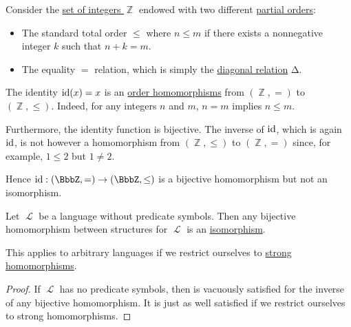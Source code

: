 \begin{example}\label{ex:bijective_order_homomorphism_not_isomorphism}
  Consider the \hyperref[def:set_of_integers]{set of integers \( \BbbZ \)} endowed with two different \hyperref[def:poset]{partial orders}:
  \begin{itemize}
    \item The standard total order \( \leq \) where \( n \leq m \) if there exists a nonnegative integer \( k \) such that \( n + k = m \).
    \item The equality \( = \) relation, which is simply the \hyperref[def:binary_relation/diagonal]{diagonal relation} \( \increment \).
  \end{itemize}

  The identity \( \operatorname{id}(x) = x \) is an \hyperref[def:preordered_set/homomorphism]{order homomorphisms} from \( (\BbbZ, =) \) to \( (\BbbZ, \leq) \). Indeed, for any integers \( n \) and \( m \), \( n = m \) implies \( n \leq m \).

  Furthermore, the identity function is bijective. The inverse of \( \operatorname{id} \), which is again \( \operatorname{id} \), is not however a homomorphism from \( (\BbbZ, \leq) \) to \( (\BbbZ, =) \) since, for example, \( 1 \leq 2 \) but \( 1 \neq 2 \).

  Hence \( \id: (\BbbZ, =) \to (\BbbZ, \leq) \) is a bijective homomorphism but not an isomorphism.
\end{example}

\begin{proposition}\label{thm:automorphism_without_predicate_symbols}
  Let \( \mscrL \) be a language without predicate symbols. Then any bijective homomorphism between structures for \( \mscrL \) is an \hyperref[def:first_order_homomorphism_invertibility/isomorphism]{isomorphism}.

  This applies to arbitrary languages if we restrict ourselves to \hyperref[rem:first_order_strong_homomorphism]{strong homomorphisms}.
\end{proposition}
\begin{proof}
  If \( \mscrL \) has no predicate symbols, then  is vacuously satisfied for the inverse of any bijective homomorphism. It is just as well satisfied if we restrict ourselves to strong homomorphisms.
\end{proof}

